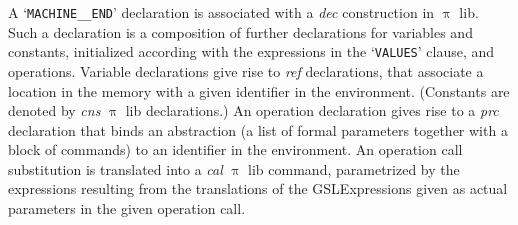 \documentclass[a4paper,openany]{book}
\begin{document}
A `\texttt{MACHINE\_\_END}' declaration is associated with a \emph{dec} construction in $\uppi$ lib. Such a declaration is a composition of further declarations for variables and constants, initialized according with the expressions in the `\texttt{VALUES}' clause, and operations. Variable declarations give rise to \emph{ref} declarations, that associate a location in the memory with a given identifier in the environment. (Constants are denoted by \emph{cns} $\uppi$ lib declarations.) An operation declaration gives rise to a \emph{prc} declaration that binds an abstraction (a list of formal parameters together with a block of commands) to an identifier in the environment. An operation call substitution is translated into a \emph{cal} $\uppi$ lib command, parametrized by the expressions resulting from the translations of the GSLExpressions given as actual parameters in the given operation call. 
\end{document}
